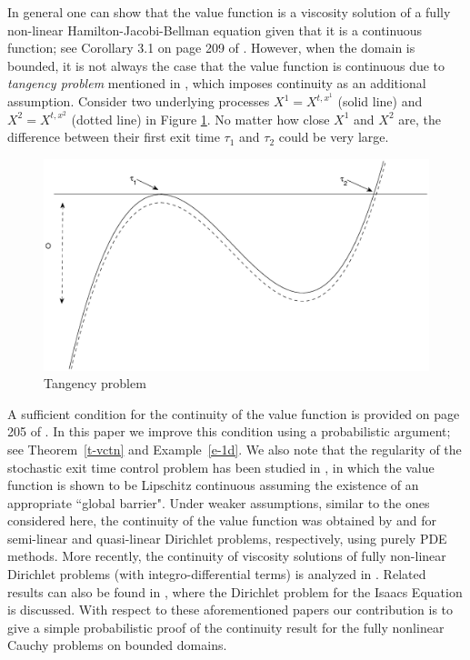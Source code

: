 \documentclass[11pt,reqno]{amsart}
\numberwithin{equation}{section}
\newcommand{\thmref}[1]{Theorem~{\rm \ref{#1}}}
\newcommand{\exmref}[1]{Example~{\rm \ref{#1}}}
\begin{document}
In general one can show that the value function is a viscosity solution of a fully non-linear Hamilton-Jacobi-Bellman equation given that it is a continuous function; see Corollary 3.1 on page 209 of \cite{FS06}.
However, when the domain is bounded, it is not always the case that the
value function is continuous  due to {\it tangency problem} mentioned in
\cite[pp. 278-279]{KD01}, which imposes continuity as an additional assumption.
Consider two underlying processes $X^1 = X^{t,x^1}$ (solid
line) and $X^2 = X^{t,x^2}$ (dotted line) in Figure
\ref{fig:png}. No matter how close $X^1$ and $X^2$ are, the 
difference between their first exit time  $\tau_1$ and $\tau_2$ could
be very large. 
\begin{figure}[htb]
  \centering
  \includegraphics[scale=0.25]{figure1.eps}
  \caption{Tangency problem}
  \label{fig:png}
\end{figure}



A sufficient condition for the continuity of the value function is
provided on page 205 of \cite{FS06}.  In this paper we improve this
condition using a probabilistic argument; see \thmref{t-vctn} and
\exmref{e-1d}. We also note that the regularity of the stochastic exit
time control problem has been studied in \cite{LM82}, in which the
value function is shown to be Lipschitz continuous assuming the existence of an appropriate ``global barrier". Under weaker assumptions, similar to the ones considered here,  the
continuity of the value function was obtained by \cite{BB95} and
\cite{IL90} for semi-linear and quasi-linear Dirichlet problems,
respectively, using purely PDE methods.  More recently, the continuity
of viscosity solutions of fully non-linear Dirichlet problems (with
integro-differential terms) is analyzed in \cite{BCI08}. 
Related results can also be found in
\cite{Kov09}, where the Dirichlet problem for the Isaacs Equation is
discussed. 
With respect
to these aforementioned papers our contribution is to give a simple
probabilistic proof of the continuity result for the fully nonlinear Cauchy problems on bounded domains. 
\end{document}
